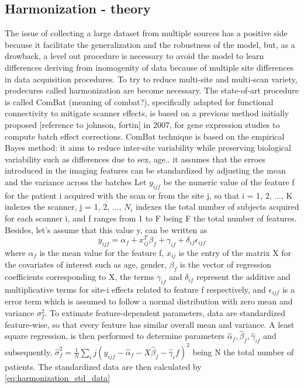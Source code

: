 \documentclass[a4paper,11pt]{article}
\begin{document}
\subsection{Harmonization - theory}
The issue of collecting a large dataset from multiple sources has a positive side because it facilitate the generalization and the robustness of the model, but, as a drowback, a level out procedure is necessary to avoid the model to learn differences deriving from inomogenity of data because of multiple site differences in data acquisition procedures.
To try to reduce multi-site and multi-scan variety, prodecures called harmonization are become necessary.
The state-of-art procedure is called ComBat (meaning of combat?), specifically adapted for functional connectivity to mitigate scanner effects, is based on a previous method initially proposed [reference to johnson, fortin] in 2007, for gene expression studies to compute batch effect corrections.
ComBat technique is based on the empirical Bayes method: it aims to reduce inter-site variability while preserving biological variability such as differences due to sex, age.. it assumes that the erroes introduced in the imaging features can be standardized by adjusting the mean and the variance across the batches
Let $y_{ijf}$ be the numeric value of the feature f for the patient i acquired with the scan or from the site j, so that i = 1, 2, ..., K indexes the scanner, j = 1, 2, ..., $N_i$ indexes the total number of subjects acquired for each scanner i, and f ranges from 1 to F being F the total number of features. Besides, let's assume that this value y, can be written as
\begin{equation}
y_{ijf} = \alpha_f + x_{ij}^T \beta _f + \gamma_{if} + \delta_{if} \epsilon_{ijf}
\end{equation}
where $\alpha_f$ is the mean value for the feature f, $x_{ij}$ is the entry of the matrix X for the covariates of interest such as age, gender, $\beta_f$ is the vector of regression coefficients corresponding to X, the terms $\gamma_{if}$ and $\delta_{if}$ represent the additive and multiplicative terms for site-i effects related to feature f respectively, and $\epsilon_{ijf}$ is a error term which is assumed to follow a normal distribution with zero mean and variance $\sigma_f^2$. To extimate feature-dependent parameters, data are standardized feature-wise, so that every feature has similar overall mean and variance. A least square regression, is then performed to determine parameters $\hat \alpha_f, \hat \beta_f, \hat \gamma_{if}$ and subsequently, $\hat \sigma^2_f = \frac{1}{N} \sum_ij \left ( y_{ijf} - \hat \alpha_f - X \hat \beta_f - \hat \gamma_if \right )^2$
being N the total number of patients.
The standardized data are then calculated by \ref{eq:harmonization_std_data}
\end{document}
